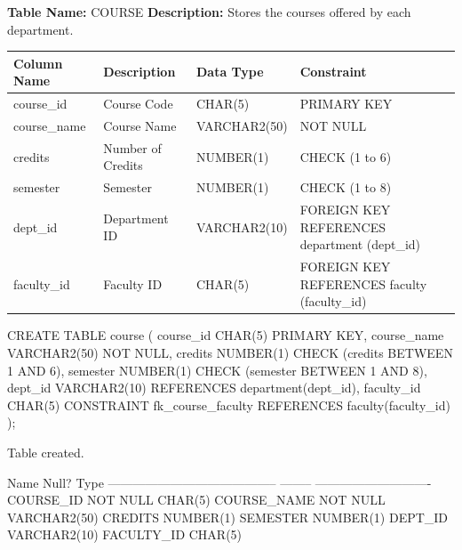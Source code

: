 
\textbf{Table Name:} COURSE \hspace{1em plus 1fill}
\textbf{Description:} Stores the courses offered by each department.

\vspace{8pt}

\renewcommand{\arraystretch}{1.4}
\begin{tabularx}{\textwidth}{|>{\raggedright\arraybackslash}X|>{\raggedright\arraybackslash}X|>{\raggedright\arraybackslash}X|>{\raggedright\arraybackslash}X|}
\hline
\textbf{Column Name} & \textbf{Description} & \textbf{Data Type} & \textbf{Constraint} \\
\hline
course\_id & Course Code & CHAR(5) & PRIMARY KEY \\
\hline
course\_name & Course Name & VARCHAR2(50) & NOT NULL \\
\hline
credits & Number of Credits & NUMBER(1) & CHECK (1 to 6) \\
\hline
semester & Semester & NUMBER(1) & CHECK (1 to 8) \\
\hline
dept\_id & Department ID & VARCHAR2(10) & FOREIGN KEY REFERENCES department (dept\_id) \\
\hline
faculty\_id & Faculty ID & CHAR(5) & FOREIGN KEY REFERENCES faculty (faculty\_id) \\
\hline
\end{tabularx}

\vspace{14pt}


\begin{sqlcode}
CREATE TABLE course (
    course_id   CHAR(5)       PRIMARY KEY,
    course_name VARCHAR2(50)  NOT NULL,
    credits     NUMBER(1)     CHECK (credits BETWEEN 1 AND 6),
    semester    NUMBER(1)     CHECK (semester BETWEEN 1 AND 8),
    dept_id     VARCHAR2(10)  REFERENCES department(dept_id),
    faculty_id  CHAR(5)
        CONSTRAINT fk_course_faculty REFERENCES faculty(faculty_id)
);
\end{sqlcode}

\vspace{16pt}


\begin{sqlout}
Table created.

 Name                                      Null?    Type
 ----------------------------------------- -------- ----------------------------
 COURSE_ID                                 NOT NULL CHAR(5)
 COURSE_NAME                               NOT NULL VARCHAR2(50)
 CREDITS                                            NUMBER(1)
 SEMESTER                                           NUMBER(1)
 DEPT_ID                                            VARCHAR2(10)
 FACULTY_ID                                         CHAR(5)
\end{sqlout}

\clearpage
